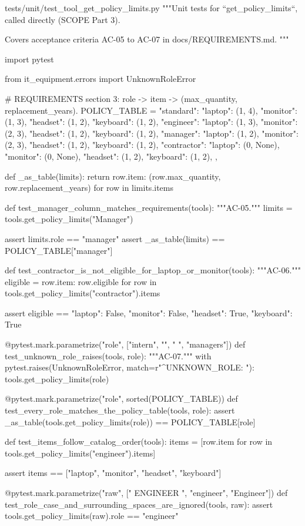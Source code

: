 \documentclass[11pt,letterpaper]{article}
\renewcommand{\_}{\textunderscore\allowbreak}
\begin{document}
\begin{codebox}{tests/unit/test_tool_get_policy_limits.py}
"""Unit tests for ``get_policy_limits``, called directly (SCOPE Part 3).

Covers acceptance criteria AC-05 to AC-07 in docs/REQUIREMENTS.md.
"""

import pytest

from it_equipment.errors import UnknownRoleError

# REQUIREMENTS section 3: role -> item -> (max_quantity, replacement_years).
POLICY_TABLE = {
    "standard": {"laptop": (1, 4), "monitor": (1, 3), "headset": (1, 2), "keyboard": (1, 2)},
    "engineer": {"laptop": (1, 3), "monitor": (2, 3), "headset": (1, 2), "keyboard": (1, 2)},
    "manager": {"laptop": (1, 2), "monitor": (2, 3), "headset": (1, 2), "keyboard": (1, 2)},
    "contractor": {
        "laptop": (0, None),
        "monitor": (0, None),
        "headset": (1, 2),
        "keyboard": (1, 2),
    },
}


def _as_table(limits):
    return {row.item: (row.max_quantity, row.replacement_years) for row in limits.items}


def test_manager_column_matches_requirements(tools):
    """AC-05."""
    limits = tools.get_policy_limits("Manager")

    assert limits.role == "manager"
    assert _as_table(limits) == POLICY_TABLE["manager"]


def test_contractor_is_not_eligible_for_laptop_or_monitor(tools):
    """AC-06."""
    eligible = {row.item: row.eligible for row in tools.get_policy_limits("contractor").items}

    assert eligible == {"laptop": False, "monitor": False, "headset": True, "keyboard": True}


@pytest.mark.parametrize("role", ["intern", "", "   ", "managers"])
def test_unknown_role_raises(tools, role):
    """AC-07."""
    with pytest.raises(UnknownRoleError, match=r"^UNKNOWN_ROLE: "):
        tools.get_policy_limits(role)


@pytest.mark.parametrize("role", sorted(POLICY_TABLE))
def test_every_role_matches_the_policy_table(tools, role):
    assert _as_table(tools.get_policy_limits(role)) == POLICY_TABLE[role]


def test_items_follow_catalog_order(tools):
    items = [row.item for row in tools.get_policy_limits("engineer").items]

    assert items == ["laptop", "monitor", "headset", "keyboard"]


@pytest.mark.parametrize("raw", ["  ENGINEER ", "engineer\n", "Engineer"])
def test_role_case_and_surrounding_spaces_are_ignored(tools, raw):
    assert tools.get_policy_limits(raw).role == "engineer"
\end{codebox}
\end{document}
